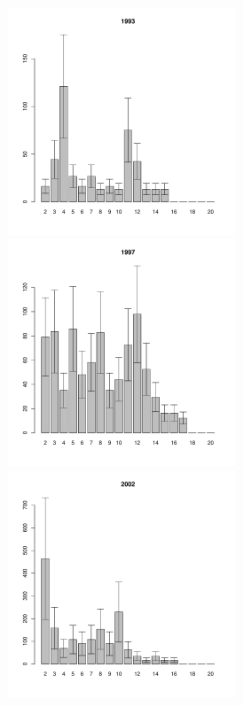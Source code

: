 \begin{figure}[hp]
\begin{minipage}[b]{.3\linewidth}
\begin{center}
	\end{center}
	\end{minipage}
	\begin{minipage}[b]{.3\linewidth}
	\begin{center}
	\includegraphics[width=60mm]{../White_Sea/Luvenga_II_razrez/fucus_zone2_1993_.pdf}
	\end{center}
	\end{minipage}
	\hfil %
	\begin{minipage}[b]{.3\linewidth}
	\begin{center}
	\includegraphics[width=60mm]{../White_Sea/Luvenga_II_razrez/fucus_zone2_1997_.pdf}
	\end{center}
	\end{minipage}
	\hfil %
	\begin{minipage}[b]{.3\linewidth}
	\begin{center}
	\includegraphics[width=60mm]{../White_Sea/Luvenga_II_razrez/fucus_zone2_2002_.pdf}
	\end{center}
	\end{minipage}



\end{figure}

